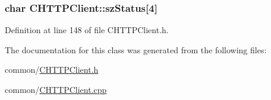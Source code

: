 \hypertarget{class_c_h_t_t_p_client_a05468a0fa4fd07830d9dc0fd0fba55ee}{
\subsubsection[{sz\-Status}]{\setlength{\rightskip}{0pt plus 5cm}char {\bf \-C\-H\-T\-T\-P\-Client\-::sz\-Status}\mbox{[}4\mbox{]}}}\label{class_c_h_t_t_p_client_a05468a0fa4fd07830d9dc0fd0fba55ee}


\-Definition at line 148 of file \-C\-H\-T\-T\-P\-Client.\-h.



\-The documentation for this class was generated from the following files\-:\begin{DoxyCompactItemize}
\item 
common/\hyperlink{_c_h_t_t_p_client_8h}{\-C\-H\-T\-T\-P\-Client.\-h}\item 
common/\hyperlink{_c_h_t_t_p_client_8cpp}{\-C\-H\-T\-T\-P\-Client.\-cpp}\end{DoxyCompactItemize}
